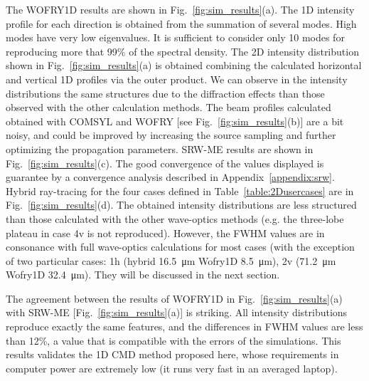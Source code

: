 \documentclass{iucr}              %
\begin{document}
\newpage
\twocolumn

The WOFRY1D results are shown in Fig.~\ref{fig:sim_results}(a). The 1D intensity profile for each direction is obtained from the summation of several modes. High modes have very low eigenvalues. It is sufficient to consider only 10 modes for reproducing more that 99\% of the spectral density. The 2D intensity distribution shown in Fig.~\ref{fig:sim_results}(a) is obtained combining the calculated horizontal and vertical 1D profiles via the outer product. 
We can observe in the intensity distributions the same structures due to the diffraction effects than those observed with the other calculation methods.
The beam profiles calculated obtained with COMSYL and WOFRY [see Fig.~\ref{fig:sim_results}(b)] are a bit noisy, and could be improved by increasing the source sampling and further optimizing the propagation parameters. 
SRW-ME results are shown in Fig.~\ref{fig:sim_results}(c). The good convergence of the values displayed is guarantee by a convergence analysis described in Appendix~\ref{appendix:srw}.
Hybrid ray-tracing for the four cases defined in Table~\ref{table:2Dusercases} are in  Fig.~\ref{fig:sim_results}(d). The obtained intensity distributions are less structured than those calculated with the other wave-optics methods (e.g. the three-lobe plateau in case 4v is not reproduced). However, the FWHM values are in consonance with full wave-optics calculations for most cases (with the exception of two particular cases:
1h (hybrid \SI{16.5}{\micro\meter} Wofry1D \SI{8.5}{\micro\meter}),
2v (\SI{71.2}{\micro\meter} Wofry1D \SI{32.4}{\micro\meter}). They will be discussed in the next section.


The agreement between the results of WOFRY1D in Fig.~\ref{fig:sim_results}(a) with SRW-ME [Fig.~\ref{fig:sim_results}(a)] is striking. All intensity distributions reproduce exactly the same features, and the differences in FWHM values are less than 12\%, a value that is compatible with the errors of the simulations. 
This results validates the 1D CMD method proposed here, whose requirements in computer power are extremely low (it runs very fast in an averaged laptop). 
\end{document}

